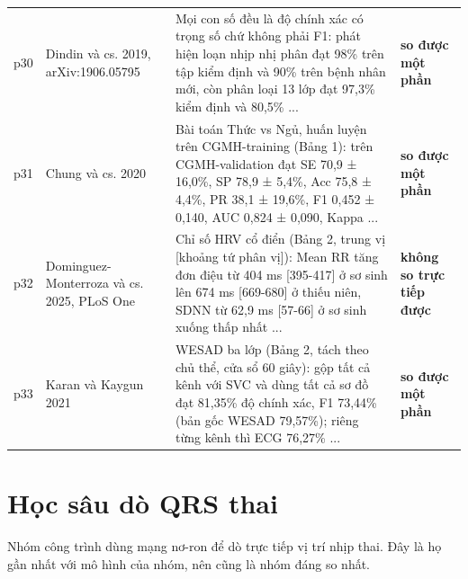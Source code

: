 \documentclass[12pt,a4paper]{article}
\begin{document}
\begin{longtable}{@{}L{1.0cm} L{3.6cm} L{6.6cm} C{3.2cm}@{}}
p30 & {\scriptsize Dindin và cs. 2019, arXiv:1906.05795} & {\scriptsize Mọi con số đều là độ chính xác có trọng số chứ không phải F1: phát hiện loạn nhịp nhị phân đạt 98\% trên tập kiểm định và 90\% trên bệnh nhân mới, còn phân loại 13 lớp đạt 97,3\% kiểm định và 80,5\% ...} & {\scriptsize\color{tdtblue}\textbf{so được một phần}} \\[2pt]
p31 & {\scriptsize Chung và cs. 2020} & {\scriptsize Bài toán Thức vs Ngủ, huấn luyện trên CGMH-training (Bảng 1): trên CGMH-validation đạt SE 70,9 ± 16,0\%, SP 78,9 ± 5,4\%, Acc 75,8 ± 4,4\%, PR 38,1 ± 19,6\%, F1 0,452 ± 0,140, AUC 0,824 ± 0,090, Kappa ...} & {\scriptsize\color{tdtblue}\textbf{so được một phần}} \\[2pt]
p32 & {\scriptsize Dominguez-Monterroza và cs. 2025, PLoS One} & {\scriptsize Chỉ số HRV cổ điển (Bảng 2, trung vị [khoảng tứ phân vị]): Mean RR tăng đơn điệu từ 404 ms [395-417] ở sơ sinh lên 674 ms [669-680] ở thiếu niên, SDNN từ 62,9 ms [57-66] ở sơ sinh xuống thấp nhất ...} & {\scriptsize\color{warnred}\textbf{không so trực tiếp được}} \\[2pt]
p33 & {\scriptsize Karan và Kaygun 2021} & {\scriptsize WESAD ba lớp (Bảng 2, tách theo chủ thể, cửa sổ 60 giây): gộp tất cả kênh với SVC và dùng tất cả sơ đồ đạt 81,35\% độ chính xác, F1 73,44\% (bản gốc WESAD 79,57\%); riêng từng kênh thì ECG 76,27\% ...} & {\scriptsize\color{tdtblue}\textbf{so được một phần}} \\[2pt]
\end{longtable}
\clearpage
\section{Học sâu dò QRS thai}
Nhóm công trình dùng mạng nơ-ron để dò trực tiếp vị trí nhịp thai. Đây là họ gần nhất với mô hình của nhóm, nên cũng là nhóm đáng so nhất.
\end{document}
